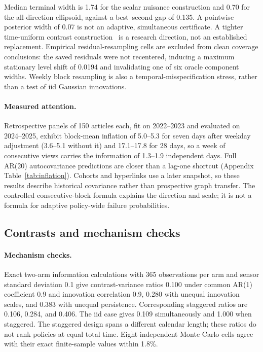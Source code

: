 \documentclass[sigconf,review,anonymous]{acmart}
\begin{document}
Median terminal width is 1.74 for the scalar nuisance construction and 0.70 for the all-direction ellipsoid, against a best--second gap of 0.135. A pointwise posterior width of 0.07 is not an adaptive, simultaneous certificate. A tighter time-uniform contrast construction~\cite{howard2021confidence} is a research direction, not an established replacement. Empirical residual-resampling cells are excluded from clean coverage conclusions: the saved residuals were not recentered, inducing a maximum stationary level shift of 0.0194 and invalidating one of six oracle component widths. Weekly block resampling is also a temporal-misspecification stress, rather than a test of iid Gaussian innovations.

\paragraph{Measured attention.} Retrospective panels of 150 articles each, fit on 2022--2023 and evaluated on 2024--2025, exhibit block-mean inflation of 5.0--5.3 for seven days after weekday adjustment (3.6--5.1 without it) and 17.1--17.8 for 28 days, so a week of consecutive views carries the information of 1.3--1.9 independent days. Full AR(20) autocovariance predictions are closer than a lag-one shortcut (Appendix Table~\ref{tab:inflation}). Cohorts and hyperlinks use a later snapshot, so these results describe historical covariance rather than prospective graph transfer. The controlled consecutive-block formula explains the direction and scale; it is not a formula for adaptive policy-wide failure probabilities.

\subsection{Contrasts and mechanism checks}

\paragraph{Mechanism checks.} Exact two-arm information calculations with 365 observations per arm and sensor standard deviation 0.1 give contrast-variance ratios 0.100 under common AR(1) coefficient 0.9 and innovation correlation 0.9, 0.280 with unequal innovation scales, and 0.383 with unequal persistence. Corresponding staggered ratios are 0.106, 0.284, and 0.406. The iid case gives 0.109 simultaneously and 1.000 when staggered. The staggered design spans a different calendar length; these ratios do not rank policies at equal total time. Eight independent Monte Carlo cells agree with their exact finite-sample values within 1.8\%.
\end{document}
